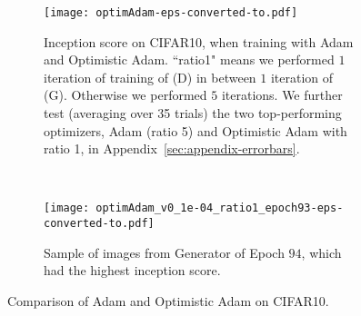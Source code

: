 \vspace{-.1in}
\begin{figure}[htpb]
    \centering
    \begin{subfigure}[b]{.67\textwidth}
        \centering
    		\texttt{[image: optimAdam-eps-converted-to.pdf]}        
		\caption{Inception score on CIFAR10, when training with Adam and Optimistic Adam. ``ratio1" means we performed $1$ iteration of training of (D) in between $1$ iteration of (G). Otherwise we performed $5$ iterations. We further test (averaging over 35 trials) the two top-performing optimizers, Adam (ratio 5) and Optimistic Adam with ratio 1, in Appendix~\ref{sec:appendix-errorbars}.}
    \end{subfigure}
    ~~
    \begin{subfigure}[b]{.3\textwidth}
        \centering
    		\texttt{[image: optimAdam\_v0\_1e-04\_ratio1\_epoch93-eps-converted-to.pdf]}
    	\caption{Sample of images from Generator of Epoch $94$, which had the highest inception score.}
    \end{subfigure}
    \caption{Comparison of Adam and Optimistic Adam on CIFAR10.}\label{fig:optimistic-Adam}
\end{figure}
